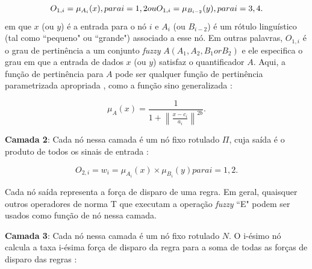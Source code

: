 \begin{equation}
\label{eq:layer1anfis}
O_{1,i} = \mu_{A_i}(x), para i = 1,2 ou \\
O_{1,i} = \mu_{B_{i-2}}(y), para i = 3,4 .
\end{equation}
em que $x$ (ou $y$) é a entrada para o nó $i$ e $A_i$ (ou $B_{i-2}$) é um rótulo linguístico (tal como ``pequeno" ou ``grande") associado a esse nó. Em outras palavras, $O_{1,i}$ é o grau de pertinência a um conjunto \textit{fuzzy} $A (A_1, A_2, B_1 or B_2)$ e ele especifica o grau em que a entrada de dados $x$ (ou $y$) satisfaz o quantificador $A$. Aqui, a função de pertinência para $ A $ pode ser qualquer função de pertinência parametrizada apropriada \label{symbol:anfis2}, como a função sino generalizada \cite{jang1997neuro}:

\begin{equation}
\label{eq:bell_anfis}
\mu_{A}(x) = \frac{1}{1 + \left\| \frac{x - c_i}{a_i} \right\|^{2b}}.
\end{equation}

\textbf{Camada 2}: Cada nó nessa camada é um nó fixo rotulado $\Pi$, cuja saída é o produto de todos os sinais de entrada \label{symbol:anfis3}:

\begin{equation}
\label{eq:layer2anfis}
O_{2,i} = w_i = \mu_{A_i}(x) \times \mu_{B_i}(y) para i = 1,2.
\end{equation}

Cada nó saída representa a força de disparo de uma regra. Em geral, quaisquer outros operadores de norma T que executam a operação \textit{fuzzy} ``E" podem ser usados como função de nó nessa camada.

\textbf{Camada 3}: Cada nó nessa camada é um nó fixo rotulado $N$. O i-ésimo nó calcula a taxa i-ésima força de disparo da regra para a soma de todas as forças de disparo das regras \label{symbol:anfis4}:

